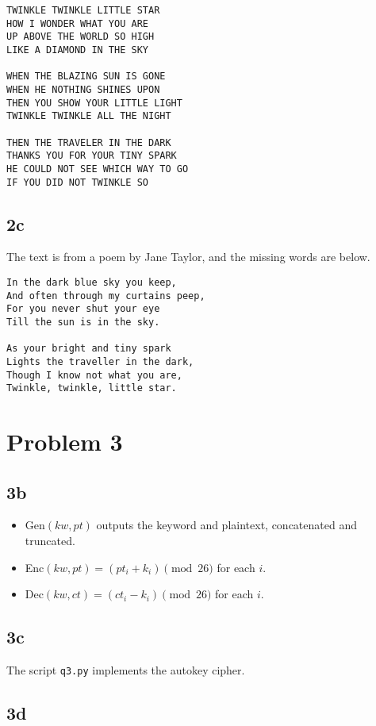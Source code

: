 \documentclass[letterpaper, 12pt]{article}
\begin{document}
\begin{Verbatim}[frame=single]
TWINKLE TWINKLE LITTLE STAR
HOW I WONDER WHAT YOU ARE
UP ABOVE THE WORLD SO HIGH
LIKE A DIAMOND IN THE SKY

WHEN THE BLAZING SUN IS GONE
WHEN HE NOTHING SHINES UPON
THEN YOU SHOW YOUR LITTLE LIGHT
TWINKLE TWINKLE ALL THE NIGHT

THEN THE TRAVELER IN THE DARK 
THANKS YOU FOR YOUR TINY SPARK
HE COULD NOT SEE WHICH WAY TO GO
IF YOU DID NOT TWINKLE SO
\end{Verbatim}

\subsection*{2c}

The text is from a poem by Jane Taylor, and the missing words are below.

\begin{Verbatim}[frame=single]
In the dark blue sky you keep,
And often through my curtains peep,
For you never shut your eye
Till the sun is in the sky.

As your bright and tiny spark
Lights the traveller in the dark,
Though I know not what you are,
Twinkle, twinkle, little star.
\end{Verbatim}

\section*{Problem 3}

\subsection*{3b}
\begin{itemize}
	\item Gen\((kw, pt)\) outputs the keyword and plaintext, concatenated and truncated.
	\item Enc\((kw, pt) = (pt_i + k_i)\pmod{26}\) for each \(i\).
	\item Dec\((kw, ct) = (ct_i - k_i)\pmod{26}\) for each \(i\).
\end{itemize}

\subsection*{3c}

The script \texttt{q3.py} implements the autokey cipher.

\subsection*{3d}
\end{document}
